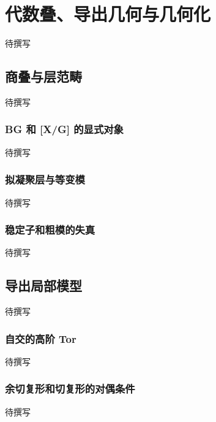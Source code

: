 
% 
% 
% 
% 
% 
% 

\chapter{代数叠、导出几何与几何化}
\label{g5:app:B}

待撰写

\section{商叠与层范畴}
\label{g5:sec:B01}
待撰写

\subsection{BG 和 [X/G] 的显式对象}
\label{g5:subsec:B01:01}
待撰写

\subsection{拟凝聚层与等变模}
\label{g5:subsec:B01:02}
待撰写

\subsection{稳定子和粗模的失真}
\label{g5:subsec:B01:03}
待撰写

\section{导出局部模型}
\label{g5:sec:B02}
待撰写

\subsection{自交的高阶 Tor}
\label{g5:subsec:B02:01}
待撰写

\subsection{余切复形和切复形的对偶条件}
\label{g5:subsec:B02:02}
待撰写

